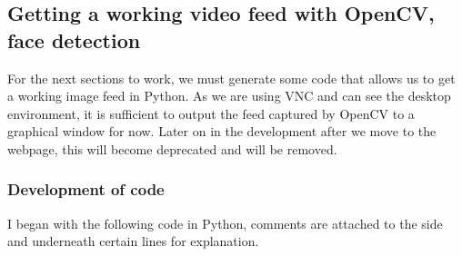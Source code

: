 \documentclass[9pt]{article}
\begin{document}
\newpage
\subsection{Getting a working video feed with OpenCV, face detection}\label{ssec_feed}
For the next sections to work, we must generate some code that allows us to get a working image feed in Python. As we are using VNC and can see the desktop environment, it is sufficient to output the feed captured by OpenCV to a graphical window for now. Later on in the development after we move to the webpage, this will become deprecated and will be removed.

\subsubsection{Development of code}
I began with the following code in Python, comments are attached to the side and underneath certain lines for explanation.
\end{document}
